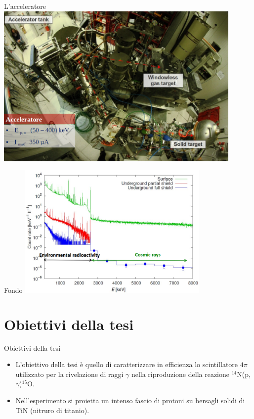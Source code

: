 \documentclass [xcolor=svgnames] {beamer}
\begin{document}
	\begin{frame}{L'acceleratore}
		\centering
		\includegraphics[width=0.9\textwidth]{img/LUNA2.png}
	\end{frame}
	
	\begin{frame}{Fondo}
		\centering
		\includegraphics[width=0.7\textwidth]{img/noise.png}
	\end{frame}
	
	\section{Obiettivi della tesi}
	\begin{frame}{Obiettivi della tesi}
		\begin{itemize}
			\item L'obiettivo della tesi è quello di caratterizzare in efficienza lo scintillatore $4\pi$ utilizzato per la rivelazione di raggi $\gamma$ nella riproduzione della reazione $^{14}$N(p,$\gamma$)$^{15}$O. 
			\item Nell'esperimento si proietta un intenso fascio di protoni su bersagli solidi di TiN (nitruro di titanio).  
		\end{itemize}
	\end{frame}
\end{document}
